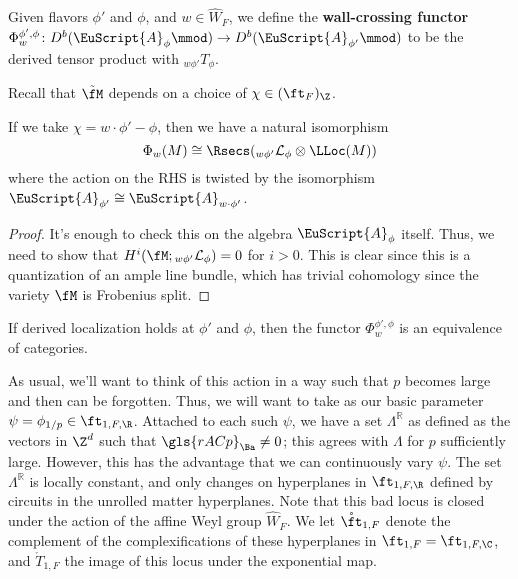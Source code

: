 \begin{definition}
Given flavors $\phi'$ and $\phi$, and $w\in \widehat{W}_F$, we define the {\bf wall-crossing functor} $\Phi_w^{\phi',\phi}\colon D^b(\EuScript{A}_{\phi}\mmod) \to D^b(\EuScript{A}_{\phi'}\mmod)$ to be the derived tensor product with ${}_{w\phi'}T_{\phi}$.
\end{definition}

Recall that $\tilde{\fM}$ depends on a choice of $\chi\in (\ft_F)_{\Z}$.  
\begin{proposition}
If we take $\chi=w\cdot \phi'-\phi$, then we have a natural isomorphism \[\Phi_w(M)\cong\Rsecs({}_{w\phi'}\mathcal{L}_{\phi}\otimes \LLoc(M))\] where the action on the RHS is twisted by the isomorphism $\EuScript{A}_{\phi'}\cong \EuScript{A}_{w\cdot \phi'}$.  
\end{proposition}
\begin{proof}
It's enough to check this on the algebra $\EuScript{A}_{\phi}$ itself. Thus, we need to show that $H^i(\fM;{}_{w\phi'}\mathcal{L}_{\phi})=0$ for $i>0$.  This is clear since this is a quantization of an ample line bundle, which has trivial cohomology since the variety $\fM$ is Frobenius split.
\end{proof}

\begin{corollary}
If derived localization holds at $\phi'$ and $\phi$, then the functor $\Phi_w^{\phi',\phi}$ is an equivalence of categories. 
\end{corollary}


As usual, we'll want to think of this action in a way such that $p$ becomes large and then can be forgotten.  Thus, we will want to take as our basic parameter $\psi=\phi_{1/p}\in \ft_{1,F,\R}$. Attached to each such $\psi$, we have a set $\Lambda^{\mathbb{R}}$ as defined as the vectors in $\Z^d$ such that $\gls{rACp}_{\Ba}\neq 0$; this agrees with $\Lambda$ for $p$ sufficiently large.  However, this has the advantage that we can continuously vary $\psi$.  The set $\Lambda^{\mathbb{R}}$ is locally constant, and only changes on hyperplanes in $\ft_{1,F,\R}$ defined by circuits in the unrolled matter hyperplanes.  Note that this bad locus is  closed under the action of the affine Weyl group $\widehat{W}_F$.  We let $\mathring{\ft}_{1,F}$ denote the complement of the complexifications of these hyperplanes in $\ft_{1,F}=\ft_{1,F,\C}$, and $\mathring{T}_{1,F}$ the image of this locus under the exponential map.


